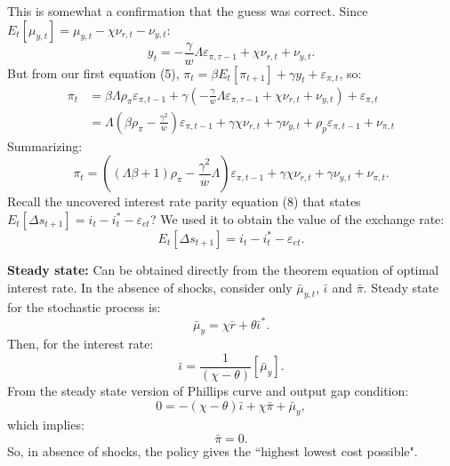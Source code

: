 \documentclass{beamer}
\begin{document}
\begin{frame} 
This is somewhat a confirmation that the guess was correct. Since 
$E_t[\mu_{y,t}] = \mu_{y,t} - \chi \nu_{r,t} - \nu_{y,t}$:
\begin{equation}
y_t = -\frac{\gamma}{w} \Lambda \varepsilon_{\pi,\tau-1} + \chi \nu_{r,t} +
\nu_{y,t}.
\end{equation}
But from our first equation (5),  $\pi_t = \beta E_t [\pi_{t+1}] + \gamma y_t +
\varepsilon_{\pi,t}$, so:
\begin{equation}
\begin{align}
\pi_t &= \beta \Lambda \rho_\pi \varepsilon_{\pi,t-1} + \gamma \left ( -\frac{\gamma}{w} \Lambda \varepsilon_{\pi,\tau-1} + \chi \nu_{r,t} + \nu_{y,t} \right ) + \varepsilon_{\pi,t} \\
&= \Lambda (\beta \rho_\pi - \frac{\gamma^2}{w}) \varepsilon_{\pi,t-1} + \gamma \chi \nu_{r,t} + \gamma \nu_{y,t} + \rho_p \varepsilon_{\pi,t-1} + \nu_{\pi,t}
\end{align}
\end{equation}
Summarizing:
\begin{equation}
\pi_t = ((\Lambda \beta + 1) \rho_\pi - \frac{\gamma^2}{w} \Lambda) \varepsilon_{\pi,t-1} + \gamma \chi \nu_{r,t} + \gamma \nu_{y,t} +
\nu_{\pi,t}.
\end{equation}
Recall the uncovered interest rate parity equation (8) that states $E_t[\Delta s_{t+1}] = i_t - i_t^* -
\varepsilon_{et}$? We used it to obtain the value of the exchange rate:
\begin{equation}
E_t [\Delta s_{t+1}] = i_t - i_t^* - \varepsilon_{et}.
\end{equation}
\end{frame}

\begin{frame} 
\textbf{Steady state:} Can be obtained directly from the theorem equation of
optimal interest rate. In the absence of shocks, consider only
$\bar{\mu}_{y,t}$, $\bar{\iota}$ and $\bar{\pi}$. Steady state for the stochastic
process is:
\begin{equation}
\bar{\mu}_y = \chi \bar{r} + \theta \bar{\iota}^*.
\end{equation}
Then, for the interest rate:
\begin{equation}
\bar{\iota} = \frac{1}{(\chi-\theta)}[\bar{\mu}_y].
\end{equation}
From the steady state version of Phillips curve and output gap condition:
\begin{equation}
0 = - (\chi - \theta) \bar{\iota} + \chi \bar{\pi} + \bar{\mu}_y,
\end{equation}
which implies:
\begin{equation}
\bar{\pi} = 0.
\end{equation}
So, in absence of shocks, the policy gives the ``highest lowest cost possible".
\end{frame}
\end{document}
